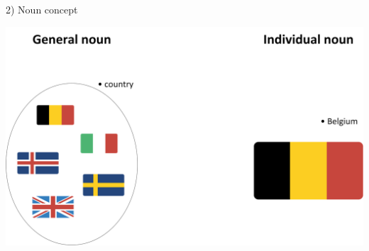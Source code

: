 \documentclass[t,12pt,english
\ifx\beamermode\undefined\else,\beamermode\fi
]{beamer}
\begin{document}
\begin{frame}{2) Noun concept}
	\begin{example}
		\centering
		\includegraphics[width=0.9\columnwidth]{assets/generalIndividualNoun}
	\end{example}
\end{frame}
\end{document}
